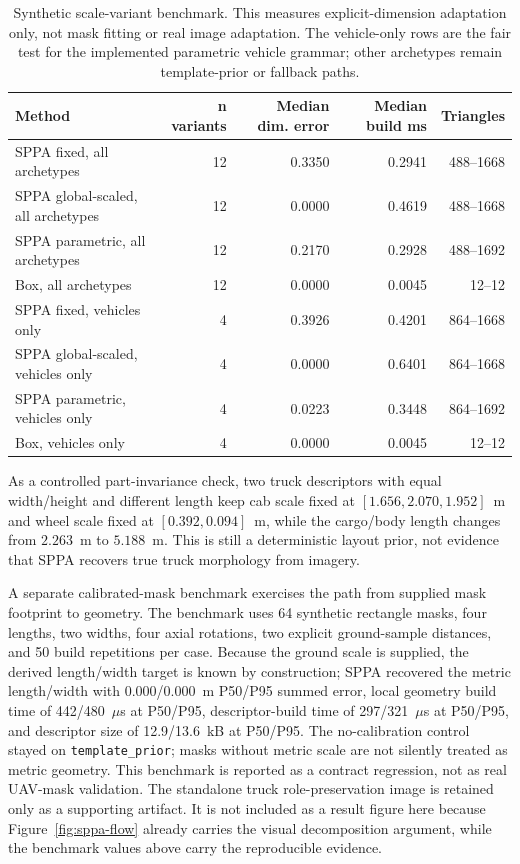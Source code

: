 ﻿\documentclass[11pt,a4paper]{article}
\begin{document}
\begin{table}[h]
\centering
\scriptsize
\setlength{\tabcolsep}{4pt}
\caption{Synthetic scale-variant benchmark. This measures explicit-dimension adaptation only, not mask fitting or real image adaptation. The vehicle-only rows are the fair test for the implemented parametric vehicle grammar; other archetypes remain template-prior or fallback paths.}
\label{tab:scale-variants}
\begin{tabular}{@{}lrrrr@{}}
\toprule
Method & n variants & Median dim. error & Median build ms & Triangles \\
\midrule
SPPA fixed, all archetypes & 12 & 0.3350 & 0.2941 & 488--1668 \\
SPPA global-scaled, all archetypes & 12 & 0.0000 & 0.4619 & 488--1668 \\
SPPA parametric, all archetypes & 12 & 0.2170 & 0.2928 & 488--1692 \\
Box, all archetypes & 12 & 0.0000 & 0.0045 & 12--12 \\
SPPA fixed, vehicles only & 4 & 0.3926 & 0.4201 & 864--1668 \\
SPPA global-scaled, vehicles only & 4 & 0.0000 & 0.6401 & 864--1668 \\
SPPA parametric, vehicles only & 4 & 0.0223 & 0.3448 & 864--1692 \\
Box, vehicles only & 4 & 0.0000 & 0.0045 & 12--12 \\
\bottomrule
\end{tabular}
\end{table}

As a controlled part-invariance check, two truck descriptors with equal
width/height and different length keep cab scale fixed at
\([1.656,2.070,1.952]\)~m and wheel scale fixed at
\([0.392,0.094]\)~m, while the cargo/body length changes from \(2.263\)~m to
\(5.188\)~m. This is still a deterministic layout prior, not evidence that SPPA
recovers true truck morphology from imagery.

A separate calibrated-mask benchmark exercises the path from supplied mask
footprint to geometry. The benchmark uses 64 synthetic rectangle masks, four
lengths, two widths, four axial rotations, two explicit ground-sample distances,
and 50 build repetitions per case. Because the ground scale is supplied, the
derived length/width target is known by construction; SPPA recovered the metric
length/width with 0.000/0.000~m P50/P95 summed error, local geometry build time
of 442/480~\(\mu\)s at P50/P95, descriptor-build time of
297/321~\(\mu\)s at P50/P95, and descriptor size of 12.9/13.6~kB at P50/P95.
The no-calibration control stayed on \texttt{template\_prior}; masks without
metric scale are not silently treated as metric geometry. This benchmark is
reported as a contract regression, not as real UAV-mask validation.
The standalone truck role-preservation image is retained only as a supporting
artifact. It is not included as a result figure here because
Figure~\ref{fig:sppa-flow} already carries the visual decomposition argument,
while the benchmark values above carry the reproducible evidence.
\end{document}
